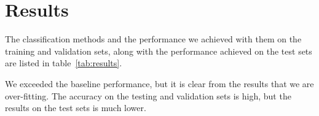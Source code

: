 \documentclass[11pt]{article}
\begin{document}


\section{Results}

  



 The classification methods and the performance we achieved with them on the training and validation sets, along with the performance achieved on the test sets are listed in table~\ref{tab:results}. 
 
We exceeded the baseline performance, but it is clear from the results that we are over-fitting. The accuracy on the testing and validation sets is high, but the results on the test sets is much lower. 
\end{document}
